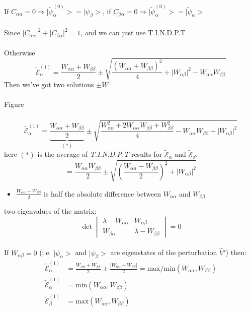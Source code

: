 \documentclass[12pt,fancychapters]{report}
\numberwithin{equation}{section}
\begin{document}
If $C_{\alpha\alpha} = 0 \Rightarrow \big|\tilde{\psi}_\alpha^{(0)}\big> = \big|\psi_\beta\big>$, 
if $C_{\beta\alpha} = 0 \Rightarrow \big|\tilde{\psi}_\alpha^{(0)}\big> = \big|\tilde{\psi}_
\alpha\big>$\\
\\
Since $\big|C_{\alpha\alpha}\big|^2 + \big|C_{\beta\alpha}\big|^2 = 1$, and we can just use 
T.I.N.D.P.T\\
\\
Otherwise
\[ 
  \tilde{\mathcal{E}}_\alpha^{(1)} = \frac{W_{\alpha\alpha}+W_{\beta\beta}}{2} \pm 
  \sqrt{\frac{\left(W_{\alpha\alpha}+W_{\beta\beta}\right)^2}{4}+ \big|W_{\alpha\beta}\big|^2 
  - W_{\alpha\alpha}W_{\beta\beta}}
\]
Then we've got two solutions $\pm W$\\
\\
Figure\\
\\
\[
  \tilde{\mathcal{E}}_\alpha^{(1)} = \underbrace{{\frac{W_{\alpha\alpha}+W_{\beta\beta}}{2}}
  }_{\text{$(*)$}} \pm \sqrt{\frac{W_{\alpha\alpha}^2 + 2W_{\alpha\alpha}W_{\beta\beta}+W_{\beta
  \beta}^2}{4} - W_{\alpha\alpha}W_{\beta\beta}+\big|W_{\alpha\beta}\big|^2}
\]
here $(*)$ is the average of \emph{T.I.N.D.P.T} results for $\tilde{\mathcal{E}}_\alpha$ and 
$\tilde{\mathcal{E}}_\beta$.
\[
  =\frac{W_{\alpha\alpha}W_{\beta\beta}}{2} \pm \sqrt{\left(\frac{W_{\alpha\alpha}
  - W_{\beta\beta}}{2}\right)^2 + \big|W_{\alpha\beta}\big|^2}
\]
\begin{itemize}
  \item $\frac{W_{\alpha\alpha}
  - W_{\beta\beta}}{2} $ is half the absolute difference between $W_{\alpha\alpha}$ and 
    $W_{\beta\beta}$
\end{itemize}
two eigenvalues of the matrix:\\ 
\[
\det\begin{vmatrix}
  \lambda-W_{\alpha\alpha} & W_{\alpha\beta} \\
  W_{\beta\alpha} & \lambda-W_{\beta\beta}
\end{vmatrix} = 0
\]
\\
If $W_{\alpha\beta}=0$ (i.e. $\big|\psi_\alpha\big>$ and $\big|\psi_\beta\big>$ are eigenstates of the 
perturbation $\hat{V}'$) then: 
\begin{align*}
  \tilde{\mathcal{E}}_\alpha^{(1)} &= \frac{W_{\alpha\alpha}+W_{\beta\beta}}{2} \pm
  \frac{\big|W_{\alpha\alpha}-W_{\beta\beta}\big|}{2}= \text{max/min}\left(W_{\alpha\alpha},W
  _{\beta\beta}\right)\\
  \tilde{\mathcal{E}}_\alpha^{(1)}&= \text{min}\left(W_{\alpha\alpha},W_{\beta\beta}\right)\\
\tilde{\mathcal{E}}_\beta^{(1)}&= \text{max}\left(W_{\alpha\alpha},W_{\beta\beta}\right)
\end{align*}
\end{document}
